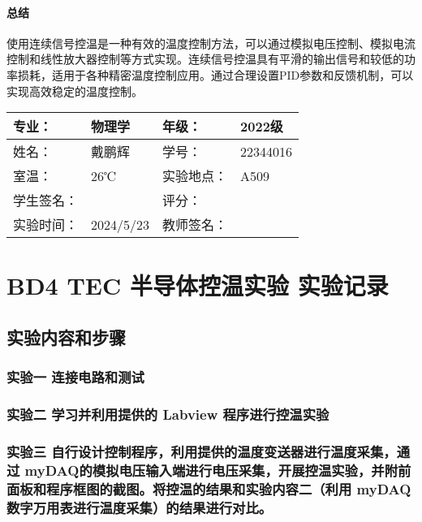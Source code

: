 \documentclass[dvipsnames, svgnames,a4paper,11pt]{article}
\begin{document}
\paragraph*{总结}

使用连续信号控温是一种有效的温度控制方法，可以通过模拟电压控制、模拟电流控制和线性放大器控制等方式实现。连续信号控温具有平滑的输出信号和较低的功率损耗，适用于各种精密温度控制应用。通过合理设置PID参数和反馈机制，可以实现高效稳定的温度控制。







\clearpage
\begin{table}
	\renewcommand\arraystretch{1.7}
	\centering
	\begin{tabularx}{\textwidth}{|X|X|X|X|}
	\hline
	专业：& 物理学 &年级：& 2022级 \\
	\hline
	姓名：& 戴鹏辉 & 学号：& 22344016 \\
	\hline
	室温：& 26℃ & 实验地点： & A509 \\
	\hline
	学生签名：& & 评分： &\\
	\hline
	实验时间：& 2024/5/23 & 教师签名：&\\
	\hline
	\end{tabularx}
\end{table}

\section{BD4 \quad TEC 半导体控温实验 \quad\heiti 实验记录}
\subsection{实验内容和步骤}

	\subsubsection{实验一 \quad 连接电路和测试}
	



	\subsubsection{实验二 \quad 学习并利用提供的 Labview 程序进行控温实验}





	\subsubsection{实验三 \quad 自行设计控制程序，利用提供的温度变送器进行温度采集，通过 myDAQ的模拟电压输入端进行电压采集，开展控温实验，并附前面板和程序框图的截图。将控温的结果和实验内容二（利用 myDAQ 数字万用表进行温度采集）的结果进行对比。}
\end{document}
